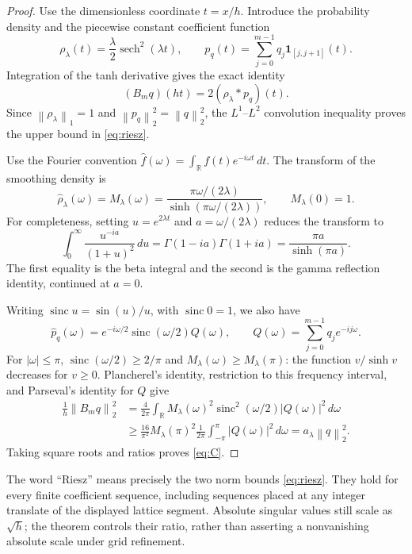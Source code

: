 \documentclass[11pt]{article}
\theoremstyle{remark}
\newcommand{\R}{\mathbb R}
\newcommand{\sech}{\operatorname{sech}}
\newcommand{\sinc}{\operatorname{sinc}}
\newcommand{\norm}[1]{\left\lVert #1\right\rVert}
\begin{document}
\begin{proof}
Use the dimensionless coordinate $t=x/h$.  Introduce the probability
density and the piecewise constant coefficient function
\[
 \rho_\lambda(t)=\frac{\lambda}{2}\sech^2(\lambda t),
 \qquad p_q(t)=\sum_{j=0}^{m-1}q_j\mathbf 1_{[j,j+1]}(t).
\]
Integration of the tanh derivative gives the exact identity
\begin{equation}\label{eq:convolution}
 (B_mq)(ht)=2(\rho_\lambda*p_q)(t).
\end{equation}
Since $\norm{\rho_\lambda}_1=1$ and
$\norm{p_q}_2^2=\norm{q}_2^2$, the $L^1$--$L^2$ convolution inequality
proves the upper bound in \eqref{eq:riesz}.

Use the Fourier convention
$\widehat f(\omega)=\int_\R f(t)e^{-i\omega t}\,dt$.
The transform of the smoothing density is
\begin{equation}\label{eq:multiplier}
 \widehat\rho_\lambda(\omega)=M_\lambda(\omega)
 =\frac{\pi\omega/(2\lambda)}{\sinh(\pi\omega/(2\lambda))},
 \qquad M_\lambda(0)=1.
\end{equation}
For completeness, setting $u=e^{2\lambda t}$ and
$a=\omega/(2\lambda)$ reduces the transform to
\[
 \int_0^\infty\frac{u^{-ia}}{(1+u)^2}\,du
 =\Gamma(1-ia)\Gamma(1+ia)
 =\frac{\pi a}{\sinh(\pi a)}.
\]
The first equality is the beta integral and the second is the gamma
reflection identity, continued at $a=0$.

Writing $\sinc u=\sin(u)/u$, with $\sinc0=1$, we also have
\[
 \widehat p_q(\omega)=e^{-i\omega/2}\sinc(\omega/2)Q(\omega),
 \qquad Q(\omega)=\sum_{j=0}^{m-1}q_je^{-ij\omega}.
\]
For $|\omega|\le\pi$, $\sinc(\omega/2)\ge2/\pi$ and
$M_\lambda(\omega)\ge M_\lambda(\pi)$: the function $v/\sinh v$
decreases for $v\ge0$.  Plancherel's identity, restriction to this
frequency interval, and Parseval's identity for $Q$ give
\begin{align*}
 \frac1h\norm{B_mq}_2^2
 &=\frac4{2\pi}\int_\R
 M_\lambda(\omega)^2\sinc^2(\omega/2)|Q(\omega)|^2\,d\omega\\
 &\ge\frac{16}{\pi^2}M_\lambda(\pi)^2
 \frac1{2\pi}\int_{-\pi}^{\pi}|Q(\omega)|^2\,d\omega
 =a_\lambda\norm{q}_2^2.
\end{align*}
Taking square roots and ratios proves \eqref{eq:C}.
\end{proof}

The word ``Riesz'' means precisely the two norm bounds
\eqref{eq:riesz}.  They hold for every finite coefficient sequence,
including sequences placed at any integer translate of the displayed
lattice segment.  Absolute singular values still scale as $\sqrt h$;
the theorem controls their ratio, rather than asserting a nonvanishing
absolute scale under grid refinement.
\end{document}
